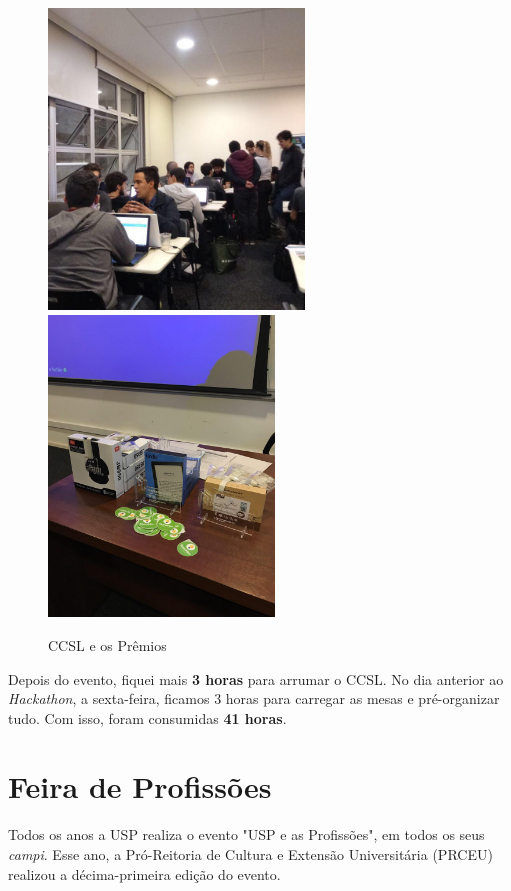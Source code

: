 \documentclass[12pt,letterpaper]{article}
\begin{document}
	\begin{figure}
		\begin{center}
			\includegraphics[height=8cm]{hack.jpg}  
			\includegraphics[height=8cm]{premio.jpg}
			\caption{CCSL e os Prêmios} 
		\end{center}
	\end{figure}	 
	
	Depois do evento, fiquei mais \textbf{3 horas} para arrumar o CCSL. No dia anterior ao \textit{Hackathon}, a sexta-feira, ficamos 3 horas para carregar as mesas e pré-organizar tudo. Com isso, foram consumidas \textbf{41 horas}.
	
	\section{Feira de Profissões}
	
	Todos os anos a USP realiza o evento "USP e as Profissões", em todos os seus \textit{campi}. Esse ano, a Pró-Reitoria de Cultura e Extensão Universitária (PRCEU) realizou a décima-primeira edição do evento.
	
\end{document}
